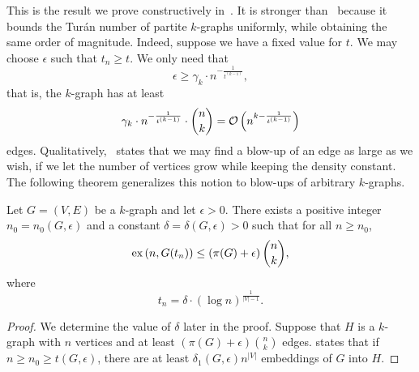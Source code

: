 This is the result we prove constructively in~.
It is stronger than~
because it bounds the Turán number of partite $k$-graphs uniformly,
while obtaining the same order of magnitude.
Indeed, suppose we have a fixed value for $t$.
We may choose $\epsilon$ such that $t_n \geq t$.
We only need that
\[
    \epsilon \geq \gamma_k \cdot n^{-\frac{1}{t^{(k-1)}}},
\]
that is, the $k$-graph has at least
\[
    \gamma_k \cdot n^{-\frac{1}{t^{(k-1)}}} \cdot \binom{n}{k} = \mathcal{O}\left(n^{k - \frac{1}{t^{(k-1)}}}\right)
\]
edges.
Qualitatively,~ states that
we may find a blow-up of an edge as large as we wish, if we let the number of vertices grow
while keeping the density constant.
The following theorem generalizes this notion to blow-ups of arbitrary $k$-graphs.

\begin{theorem} \label{thm:quant-blowup}
    Let $G = (V, E)$ be a $k$-graph and let $\epsilon > 0$.
    There exists a positive integer $n_0 = n_0(G, \epsilon)$ and a constant $\delta = \delta(G, \epsilon) > 0$
    such that for all $n \geq n_0$,
    \[
         \text{ex} \left( n, G(t_n) \right) \leq \left( \pi(G) + \epsilon \right) \binom{n}{k},
    \]
    where
    \[
        t_n = \delta \cdot (\log n)^{\frac{1}{|V|-1}}.
    \]
    \begin{proof}

        We determine the value of $\delta$ later in the proof.
        Suppose that $H$ is a $k$-graph with $n$ vertices and at least $(\pi(G) + \epsilon) \binom{n}{k}$ edges.
         states that if $n \geq n_0 \geq t(G, \epsilon)$,
        there are at least $\delta_1(G, \epsilon) n^{|V|}$ embeddings of $G$ into $H$.


\end{proof}
\end{theorem}
